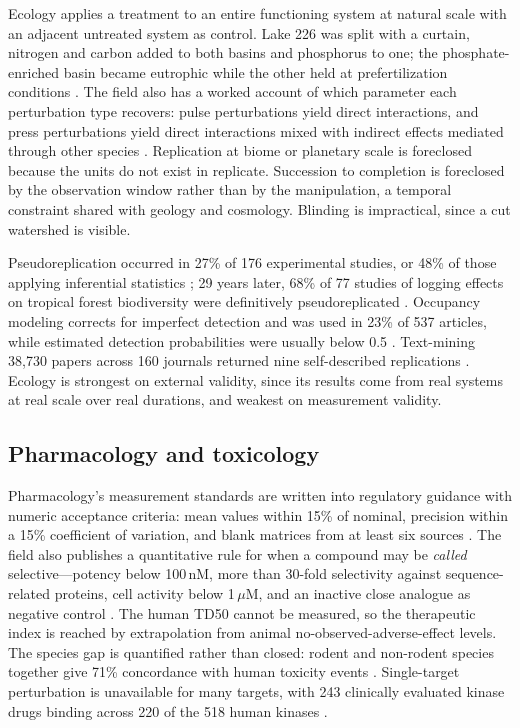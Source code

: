 \documentclass{article}
\begin{document}
Ecology applies a treatment to an entire functioning system at natural scale with an adjacent untreated system as control. Lake 226 was split with a curtain, nitrogen and carbon added to both basins and phosphorus to one; the phosphate-enriched basin became eutrophic while the other held at prefertilization conditions \citep{schindler1974eutrophication}. The field also has a worked account of which parameter each perturbation type recovers: pulse perturbations yield direct interactions, and press perturbations yield direct interactions mixed with indirect effects mediated through other species \citep{bender1984perturbation}. Replication at biome or planetary scale is foreclosed because the units do not exist in replicate. Succession to completion is foreclosed by the observation window rather than by the manipulation, a temporal constraint shared with geology and cosmology. Blinding is impractical, since a cut watershed is visible.

Pseudoreplication occurred in 27\% of 176 experimental studies, or 48\% of those applying inferential statistics \citep{hurlbert1984pseudoreplication}; 29 years later, 68\% of 77 studies of logging effects on tropical forest biodiversity were definitively pseudoreplicated \citep{ramage2013pseudoreplication}. Occupancy modeling corrects for imperfect detection and was used in 23\% of 537 articles, while estimated detection probabilities were usually below 0.5 \citep{kellner2014accounting}. Text-mining 38,730 papers across 160 journals returned nine self-described replications \citep{kelly2019rate}. Ecology is strongest on external validity, since its results come from real systems at real scale over real durations, and weakest on measurement validity.

\subsection{Pharmacology and toxicology}

Pharmacology's measurement standards are written into regulatory guidance with numeric acceptance criteria: mean values within 15\% of nominal, precision within a 15\% coefficient of variation, and blank matrices from at least six sources \citep{fdabioanalytical}. The field also publishes a quantitative rule for when a compound may be \emph{called} selective---potency below 100\,nM, more than 30-fold selectivity against sequence-related proteins, cell activity below 1\,$\mu$M, and an inactive close analogue as negative control \citep{arrowsmith2015promise}. The human TD50 cannot be measured, so the therapeutic index is reached by extrapolation from animal no-observed-adverse-effect levels. The species gap is quantified rather than closed: rodent and non-rodent species together give 71\% concordance with human toxicity events \citep{olson2000concordance}. Single-target perturbation is unavailable for many targets, with 243 clinically evaluated kinase drugs binding across 220 of the 518 human kinases \citep{klaeger2017target}.
\end{document}
